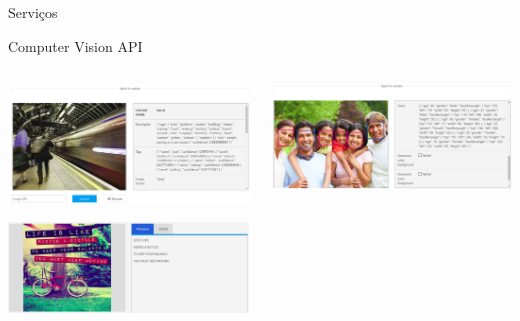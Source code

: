 \documentclass{beamer}
\begin{document}
\begin{frame}{Serviços}

\begin{exampleblock}{}
   \begin{center}
   Computer Vision API
   \end{center}
\end{exampleblock}

\begin{columns}
\begin{column}{0.5\textwidth}
\begin{center}
\includegraphics[width=1\textwidth]{img/Azuri_1.png}   

\includegraphics[width=1\textwidth]{img/Azuri_3.png}   
\end{center}
\end{column}
\begin{column}{0.5\textwidth}
\begin{center}
\includegraphics[width=1\textwidth]{img/Azuri_2.png}   


\end{center}
\end{column}
\end{columns}
\end{frame}
\end{document}
